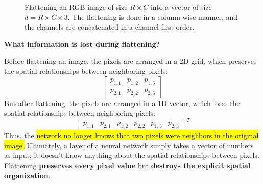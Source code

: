 \begin{figure}[!htp]
    \caption{Flattening an RGB image of size $R \times C$ into a vector of size $d = R \times C \times 3$. The flattening is done in a column-wise manner, and the channels are concatenated in a channel-first order.}
    \label{fig:flattening-rgb-image}
\end{figure}

\begin{flushleft}
    \textcolor{Red2}{ \textbf{What information is lost during flattening?}}
\end{flushleft}
Before flattening an image, the pixels are arranged in a 2D grid, which preserves the spatial relationships between neighboring pixels:
\begin{equation*}
    \begin{bmatrix}
        p_{1,1} & p_{1,2} & p_{1,3} \\
        p_{2,1} & p_{2,2} & p_{2,3}
    \end{bmatrix}
\end{equation*}
But after flattening, the pixels are arranged in a 1D vector, which loses the spatial relationships between neighboring pixels:
\begin{equation*}
    \begin{bmatrix}
        p_{1,1} &
        p_{2,1} &
        p_{1,2} &
        p_{2,2} &
        p_{1,3} &
        p_{2,3}
    \end{bmatrix}^{T}
\end{equation*}
Thus, the \hl{network no longer knows that two pixels were neighbors in the original image.} Ultimately, a layer of a neural network simply takes a vector of numbers as input; it doesn't know anything about the spatial relationships between pixels. Flattening \textbf{preserves every pixel value} but \textbf{destroys the explicit spatial organization}.

